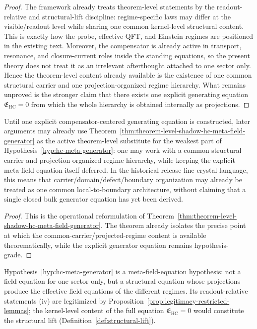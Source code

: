 \begin{proof}
The framework already treats theorem-level statements by the readout-relative and structural-lift discipline: regime-specific laws may differ at the visible/readout level while sharing one common kernel-level structural content. This is exactly how the probe, effective QFT, and Einstein regimes are positioned in the existing text. Moreover, the compensator is already active in transport, resonance, and closure-current roles inside the standing equations, so the present theory does not treat it as an irrelevant afterthought attached to one sector only. Hence the theorem-level content already available is the existence of one common structural carrier and one projection-organized regime hierarchy. What remains unproved is the stronger claim that there exists one explicit generating equation $\mathfrak E_{\mathrm{HC}}=0$ from which the whole hierarchy is obtained internally as projections.
\end{proof}

\begin{corollary}
\label{cor:operational-reading-hypothesis-74-v320}
Until one explicit compensator-centered generating equation is constructed, later arguments may already use Theorem~\ref{thm:theorem-level-shadow-hc-meta-field-generator} as the active theorem-level substitute for the weakest part of Hypothesis~\ref{hyp:hc-meta-generator}: one may work with a common structural carrier and projection-organized regime hierarchy, while keeping the explicit meta-field equation itself deferred. In the historical release line crystal language, this means that carrier/domain/defect/boundary organization may already be treated as one common local-to-boundary architecture, without claiming that a single closed bulk generator equation has yet been derived.
\end{corollary}

\begin{proof}
This is the operational reformulation of Theorem~\ref{thm:theorem-level-shadow-hc-meta-field-generator}. The theorem already isolates the precise point at which the common-carrier/projected-regime content is available theorematically, while the explicit generator equation remains hypothesis-grade.
\end{proof}


\begin{remark}
Hypothesis~\ref{hyp:hc-meta-generator} is a meta-field-equation
hypothesis: not a field equation for one sector only, but a structural
equation whose projections produce the effective field equations of the
different regimes. Its readout-relative statements (iv) are
legitimized by Proposition~\ref{prop:legitimacy-restricted-lemmas};
the kernel-level content of the full equation $\mathfrak{E}_{\mathrm{HC}} = 0$
would constitute the structural lift
(Definition~\ref{def:structural-lift}).
\end{remark}

